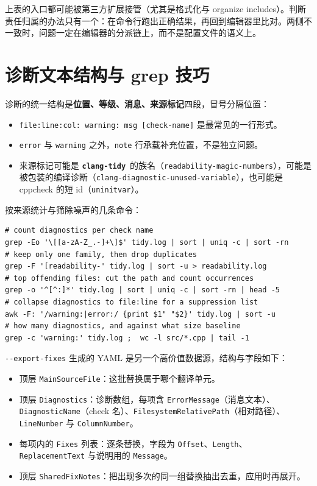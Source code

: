 \documentclass[12pt,a4paper,fontset=fandol]{ctexbook}
\newcommand{\Opt}[1]{\texttt{-\/-#1}}
\newcommand{\Lib}[1]{\textbf{\texttt{#1}}}
\newcommand{\Tidy}{\Lib{clang-tidy}}
\begin{document}
\begin{note}[title={编辑器只负责「发起」，不负责「正确」}]
上表的入口都可能被第三方扩展接管（尤其是格式化与 organize includes）。判断责任归属的办法只有一个：在命令行跑出正确结果，再回到编辑器里比对。两侧不一致时，问题一定在编辑器的分派链上，而不是配置文件的语义上。
\end{note}

\section{诊断文本结构与 grep 技巧}\label{sec:appB-s9}

诊断的统一结构是\textbf{位置、等级、消息、来源标记}四段，冒号分隔位置：

\begin{itemize}
  \item \texttt{file:line:col: warning: msg [check-name]} 是最常见的一行形式。
  \item \texttt{error} 与 \texttt{warning} 之外，\texttt{note} 行承载补充位置，不是独立问题。
  \item 来源标记可能是 \Tidy\ 的族名（\texttt{readability-\allowbreak magic-numbers}），可能是被包装的编译诊断（\texttt{clang-diagnostic-\allowbreak unused-variable}），也可能是 cppcheck 的短 id（\texttt{uninitvar}）。
\end{itemize}

按来源统计与筛除噪声的几条命令：

\begin{lstlisting}[style=shellstyle,caption={用 grep 与 awk 把诊断变成可统计的数据}]
# count diagnostics per check name
grep -Eo '\[[a-zA-Z_.-]+\]$' tidy.log | sort | uniq -c | sort -rn
# keep only one family, then drop duplicates
grep -F '[readability-' tidy.log | sort -u > readability.log
# top offending files: cut the path and count occurrences
grep -o '^[^:]*' tidy.log | sort | uniq -c | sort -rn | head -5
# collapse diagnostics to file:line for a suppression list
awk -F: '/warning:|error:/ {print $1" "$2}' tidy.log | sort -u
# how many diagnostics, and against what size baseline
grep -c 'warning:' tidy.log ;  wc -l src/*.cpp | tail -1
\end{lstlisting}

\Opt{export-fixes} 生成的 YAML 是另一个高价值数据源，结构与字段如下：

\begin{itemize}
  \item 顶层 \texttt{MainSourceFile}：这批替换属于哪个翻译单元。
  \item 顶层 \texttt{Diagnostics}：诊断数组，每项含 \texttt{ErrorMessage}（消息文本）、\texttt{Diagnostic\allowbreak Name}（check 名）、\texttt{Filesystem\allowbreak RelativePath}（相对路径）、\texttt{LineNumber} 与 \texttt{ColumnNumber}。
  \item 每项内的 \texttt{Fixes} 列表：逐条替换，字段为 \texttt{Offset}、\texttt{Length}、\texttt{ReplacementText} 与说明用的 \texttt{Message}。
  \item 顶层 \texttt{SharedFixNotes}：把出现多次的同一组替换抽出去重，应用时再展开。
\end{itemize}
\end{document}
